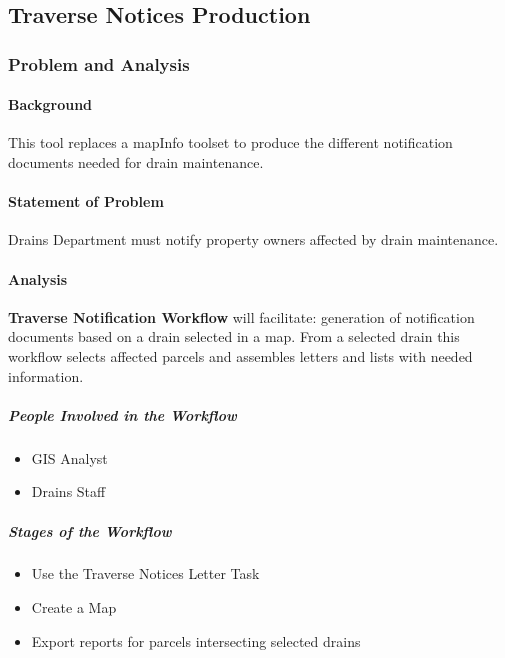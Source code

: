%
%
%
%
% 
\subsection{Traverse Notices Production}
\subsubsection{Problem and Analysis}
\begin{adjmulticols}{2}{\innerMar}{\outerMar}
\paragraph{Background}
\noindent This tool replaces a mapInfo toolset to produce the different notification documents needed for drain maintenance.
\paragraph{Statement of Problem}
\noindent Drains Department must notify property owners affected by drain maintenance. 
\paragraph{Analysis}
\noindent \textbf{Traverse Notification Workflow} will facilitate: generation of notification documents based on a drain selected in a map.  From a selected drain this workflow selects affected parcels and assembles letters and lists with needed information.
\subparagraph{People Involved in the Workflow}
\begin{itemize} %
\item GIS Analyst
\item Drains Staff
\end{itemize} %
\subparagraph*{Stages of the Workflow}
\begin{itemize} %
\item Use the Traverse Notices Letter Task
\item Create a Map
\item Export reports for parcels intersecting selected drains
\end{itemize} %
\end{adjmulticols}
\clearpage
